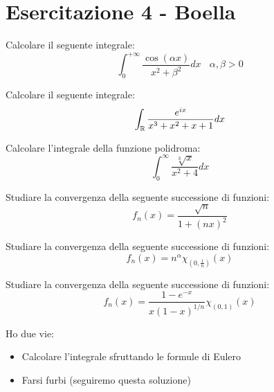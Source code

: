 \chapter{Esercitazione 4 - Boella}

\ParteEsercizi

\Esercizio{}

Calcolare il seguente integrale:
\begin{equation*}
\int^{+ \infty}_{0}\frac{\cos (\alpha x)}{x^{2} + \beta^{2}} dx\ \ \ \ \alpha, \beta > 0
\end{equation*}

\Esercizio{}

Calcolare il seguente integrale:
\begin{equation*}
\int_{\mathbb{R}}\frac{e^{ix}}{x^{3} + x^{2} + x + 1} dx
\end{equation*}

\Esercizio{}

Calcolare l'integrale della funzione polidroma:
\begin{equation*}
\int^{\infty}_{0}\frac{\sqrt[3]{x}}{x^{2} + 4} dx
\end{equation*}

\Esercizio{}

Studiare la convergenza della seguente successione di funzioni:
\begin{equation*}
f_{n} (x) = \frac{\sqrt{n}}{1 + (nx)^{2}}
\end{equation*}

\Esercizio{}

Studiare la convergenza della seguente successione di funzioni:
\begin{equation*}
f_{n} (x) = n^{\alpha} \chi_{\left(0, \frac{1}{n}\right)} (x)
\end{equation*}

\Esercizio{}

Studiare la convergenza della seguente successione di funzioni:
\begin{equation*}
f_{n} (x) = \frac{1 - e^{- x}}{x(1 - x)^{1/n}} \chi_{(0, 1)} (x)
\end{equation*}

\ParteSoluzioni

\Soluzione

Ho due vie:
\begin{itemize}
\item Calcolare l'integrale sfruttando le formule di Eulero
\item Farsi furbi (seguiremo questa soluzione)
\end{itemize}

